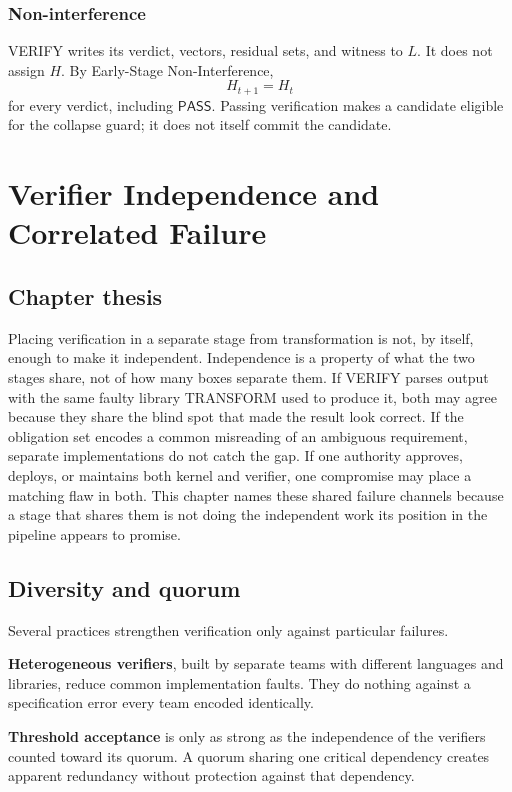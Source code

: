 \documentclass[11pt,openany]{book}
\newcommand{\Pass}{\mathsf{PASS}}
\begin{document}
\subsection{Non-interference}

VERIFY writes its verdict, vectors, residual sets, and witness to \(L\). It
does not assign \(H\). By Early-Stage Non-Interference,
\[
 H_{t+1}=H_t
\]
for every verdict, including \(\Pass\). Passing verification makes a candidate
eligible for the collapse guard; it does not itself commit the candidate.

\chapter{Verifier Independence and Correlated Failure}
\section{Chapter thesis}

Placing verification in a separate stage from transformation is not, by
itself, enough to make it independent. Independence is a property of what the
two stages share, not of how many boxes separate them. If VERIFY parses output
with the same faulty library TRANSFORM used to produce it, both may agree
because they share the blind spot that made the result look correct. If the
obligation set encodes a common misreading of an ambiguous requirement,
separate implementations do not catch the gap. If one authority approves,
deploys, or maintains both kernel and verifier, one compromise may place a
matching flaw in both. This chapter names these shared failure channels because
a stage that shares them is not doing the independent work its position in the
pipeline appears to promise.

\section{Diversity and quorum}

Several practices strengthen verification only against particular failures.

\textbf{Heterogeneous verifiers}, built by separate teams with different
languages and libraries, reduce common implementation faults. They do nothing
against a specification error every team encoded identically.

\textbf{Threshold acceptance} is only as strong as the independence of the
verifiers counted toward its quorum. A quorum sharing one critical dependency
creates apparent redundancy without protection against that dependency.
\end{document}
